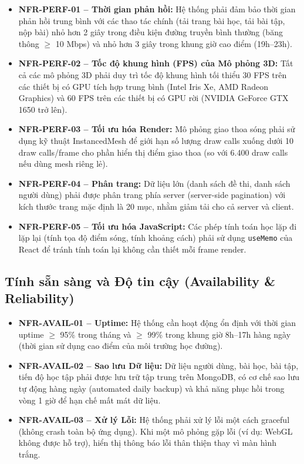 \begin{itemize}
    \item \textbf{NFR-PERF-01 – Thời gian phản hồi:} Hệ thống phải đảm bảo thời gian phản hồi trung bình với các thao tác chính (tải trang bài học, tải bài tập, nộp bài) nhỏ hơn 2 giây trong điều kiện đường truyền bình thường (băng thông $\geq$ 10 Mbps) và nhỏ hơn 3 giây trong khung giờ cao điểm (19h–23h).
    
    \item \textbf{NFR-PERF-02 – Tốc độ khung hình (FPS) của Mô phỏng 3D:} Tất cả các mô phỏng 3D phải duy trì tốc độ khung hình tối thiểu 30 FPS trên các thiết bị có GPU tích hợp trung bình (Intel Iris Xe, AMD Radeon Graphics) và 60 FPS trên các thiết bị có GPU rời (NVIDIA GeForce GTX 1650 trở lên).
    
    \item \textbf{NFR-PERF-03 – Tối ưu hóa Render:} Mô phỏng giao thoa sóng phải sử dụng kỹ thuật InstancedMesh để giới hạn số lượng draw calls xuống dưới 10 draw calls/frame cho phần hiển thị điểm giao thoa (so với 6.400 draw calls nếu dùng mesh riêng lẻ).
    
    \item \textbf{NFR-PERF-04 – Phân trang:} Dữ liệu lớn (danh sách đề thi, danh sách người dùng) phải được phân trang phía server (server-side pagination) với kích thước trang mặc định là 20 mục, nhằm giảm tải cho cả server và client.
    
    \item \textbf{NFR-PERF-05 – Tối ưu hóa JavaScript:} Các phép tính toán học lặp đi lặp lại (tính tọa độ điểm sóng, tính khoảng cách) phải sử dụng \texttt{useMemo} của React để tránh tính toán lại không cần thiết mỗi frame render.
\end{itemize}

\subsection{Tính sẵn sàng và Độ tin cậy (Availability \& Reliability)}

\begin{itemize}
    \item \textbf{NFR-AVAIL-01 – Uptime:} Hệ thống cần hoạt động ổn định với thời gian uptime $\geq$ 95\% trong tháng và $\geq$ 99\% trong khung giờ 8h–17h hàng ngày (thời gian sử dụng cao điểm của môi trường học đường).
    
    \item \textbf{NFR-AVAIL-02 – Sao lưu Dữ liệu:} Dữ liệu người dùng, bài học, bài tập, tiến độ học tập phải được lưu trữ tập trung trên MongoDB, có cơ chế sao lưu tự động hàng ngày (automated daily backup) và khả năng phục hồi trong vòng 1 giờ để hạn chế mất mát dữ liệu.
    
    \item \textbf{NFR-AVAIL-03 – Xử lý Lỗi:} Hệ thống phải xử lý lỗi một cách graceful (không crash toàn bộ ứng dụng). Khi một mô phỏng gặp lỗi (ví dụ: WebGL không được hỗ trợ), hiển thị thông báo lỗi thân thiện thay vì màn hình trắng.
\end{itemize}

